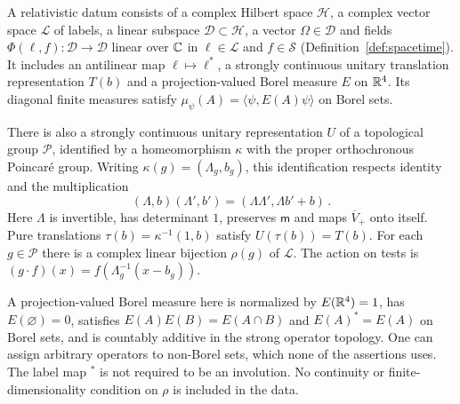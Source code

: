 \begin{definition}\label{def:relativistic}
A relativistic datum consists of a complex Hilbert space $\mathcal H$, a complex vector space $\mathcal L$ of labels, a linear subspace $\mathcal D\subset\mathcal H$, a vector $\Omega\in\mathcal D$ and fields $\Phi(\ell,f):\mathcal D\to\mathcal D$ linear over $\mathbb C$ in $\ell\in\mathcal L$ and $f\in\mathcal S$ (Definition~\ref{def:spacetime}).
It includes an antilinear map $\ell\mapsto\ell^*$, a strongly continuous unitary translation representation $T(b)$ and a projection-valued Borel measure $E$ on $\mathbb R^4$.
Its diagonal finite measures satisfy $\mu_\psi(A)=\langle\psi,E(A)\psi\rangle$ on Borel sets.

There is also a strongly continuous unitary representation $U$ of a topological group $\mathcal P$, identified by a homeomorphism $\kappa$ with the proper orthochronous Poincar\'e group.
Writing $\kappa(g)=(\Lambda_g,b_g)$, this identification respects identity and the multiplication
\begin{equation}\label{eq:poincare}
(\Lambda,b)(\Lambda',b')=(\Lambda\Lambda',\Lambda b'+b)\,.
\end{equation}
Here $\Lambda$ is invertible, has determinant $1$, preserves $\mathsf m$ and maps $\overline V_+$ onto itself.
Pure translations $\tau(b)=\kappa^{-1}(1,b)$ satisfy $U(\tau(b))=T(b)$.
For each $g\in\mathcal P$ there is a complex linear bijection $\rho(g)$ of $\mathcal L$.
The action on tests is $(g\cdot f)(x)=f(\Lambda_g^{-1}(x-b_g))$.
\end{definition}

A projection-valued Borel measure here is normalized by $E(\mathbb R^4)=1$, has $E(\varnothing)=0$, satisfies $E(A)E(B)=E(A\cap B)$ and $E(A)^*=E(A)$ on Borel sets, and is countably additive in the strong operator topology.
One can assign arbitrary operators to non-Borel sets, which none of the assertions uses.
The label map ${}^*$ is not required to be an involution.
No continuity or finite-dimensionality condition on $\rho$ is included in the data.

